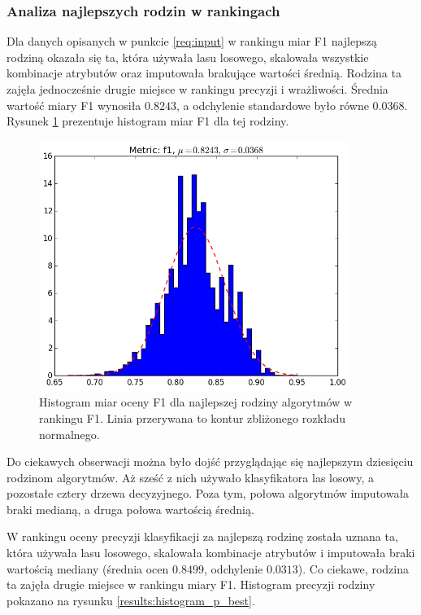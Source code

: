 \documentclass[../thesis.tex]{subfiles}
\begin{document}
\subsubsection{Analiza najlepszych rodzin w rankingach}

Dla danych opisanych w punkcie \ref{req:input} w rankingu miar F1 najlepszą rodziną okazała się ta, która używała lasu losowego, skalowała wszystkie kombinacje atrybutów oraz imputowała brakujące wartości średnią. Rodzina ta zajęła jednocześnie drugie miejsce w rankingu precyzji i wrażliwości. Średnia wartość miary F1 wynosiła $0.8243$, a odchylenie standardowe było równe $0.0368$. Rysunek \ref{results:histogram_f1_best} prezentuje histogram miar F1 dla tej rodziny.

\begin{figure}[h]
\centering
\includegraphics[width=0.9\textwidth]{10-f1.png}
\caption{Histogram miar oceny F1 dla najlepszej rodziny algorytmów w rankingu F1. Linia przerywana to kontur zbliżonego rozkładu normalnego.}
\label{results:histogram_f1_best}
\end{figure}

Do ciekawych obserwacji można było dojść przyglądając się najlepszym dziesięciu rodzinom algorytmów. Aż sześć z nich używało klasyfikatora las losowy, a pozostałe cztery drzewa decyzyjnego. Poza tym, połowa algorytmów imputowała braki medianą, a druga połowa wartością średnią. 

W rankingu oceny precyzji klasyfikacji za najlepszą rodzinę została uznana ta, która używała lasu losowego, skalowała kombinacje atrybutów i imputowała braki wartością mediany (średnia ocen $0.8499$, odchylenie $0.0313$). Co ciekawe, rodzina ta zajęła drugie miejsce w rankingu miary F1. Histogram precyzji rodziny pokazano na rysunku \ref{results:histogram_p_best}.
\end{document}
